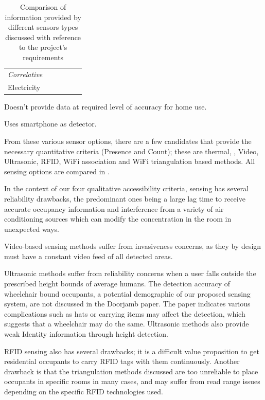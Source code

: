 \documentclass[../thesis/thesis.tex]{subfiles}
\begin{document}
\begin{table}
\begin{threeparttable}
\begin{tabularx}{\textwidth}{|l|l|l||l||l|l|}
\hspace{3mm}\textit{Correlative} 	& & & & & \\
\hspace{8mm}Electricity 		& \cmark\ssup & \xmark & \cmark & & \\

\cline{1-6}
\end{tabularx}
\begin{tablenotes}
\item \ssup  Doesn't provide data at required level of accuracy for home use.
\item \tsup  Uses smartphone as detector.
\end{tablenotes}
\end{threeparttable}
\caption{Comparison of information provided by different sensors types discussed with reference to the project's requirements}
\label{tab:litreview:taxonomycomp}
\end{table}

From these various sensor options, there are a few candidates that provide the necessary quantitative criteria (Presence and Count); these are thermal, \cdi, Video, Ultrasonic, RFID, WiFi association and WiFi triangulation based methods. All sensing options are compared in .

In the context of our four qualitative accessibility criteria, \cdi sensing has several reliability drawbacks, the predominant ones being a large lag time to receive accurate occupancy information and interference from a variety of air conditioning sources which can modify the \cdi concentration in the room in unexpected ways.

Video-based sensing methods suffer from invasiveness concerns, as they by design must have a constant video feed of all detected areas.

Ultrasonic methods suffer from reliability concerns when a user falls outside the prescribed height bounds of average humans. The detection accuracy of wheelchair bound occupants, a potential demographic of our proposed sensing system, are not discussed in the Doorjamb paper. The paper indicates various complications such as hats or carrying items may affect the detection, which suggests that a wheelchair may do the same. Ultrasonic methods also provide weak Identity information through height detection.

RFID sensing also has several drawbacks; it is a difficult value proposition to get residential occupants to carry RFID tags with them continuously. Another drawback is that the triangulation methods discussed are too unreliable to place occupants in specific rooms in many cases, and may suffer from read range issues depending on the specific RFID technologies used.
\end{document}
